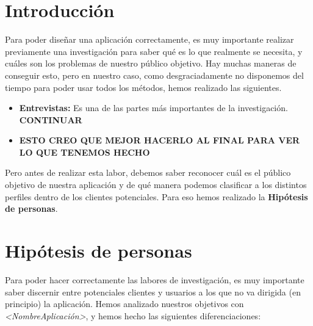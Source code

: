 
\section{Introducción}

Para poder diseñar una aplicación correctamente, es muy importante realizar previamente una investigación para saber qué
es lo que realmente se necesita, y cuáles son los problemas de nuestro público objetivo. Hay muchas maneras de conseguir esto, pero en nuestro
caso, como desgraciadamente no disponemos del tiempo para poder usar todos los métodos, hemos realizado las siguientes.

\begin{itemize}
    \item \textbf{Entrevistas:} Es una de las partes más importantes de la investigación. \textbf{CONTINUAR}
    \item \textbf{ESTO CREO QUE MEJOR HACERLO AL FINAL PARA VER LO QUE TENEMOS HECHO}
\end{itemize}



Pero antes de realizar esta labor, debemos saber reconocer cuál es el público objetivo de nuestra aplicación y
de qué manera podemos clasificar a los distintos perfiles dentro de los clientes potenciales. Para eso hemos realizado la
\textbf{Hipótesis de personas}.

\section{Hipótesis de personas}

Para poder hacer correctamente las labores de investigación, es muy importante saber discernir entre potenciales clientes y usuarios
a los que no va dirigida (en principio) la aplicación. Hemos analizado nuestros objetivos con \textit{<NombreAplicación>}, y hemos hecho las siguientes
diferenciaciones:

